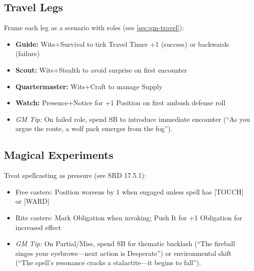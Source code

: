 \subsection{Travel Legs}
Frame each leg as a scenario with roles (see \ref{sec:gm-travel}):
\begin{itemize}
  \item \textbf{Guide:} Wits+Survival to tick Travel Timer +1 (success) or backwards (failure)
  \item \textbf{Scout:} Wits+Stealth to avoid surprise on first encounter
  \item \textbf{Quartermaster:} Wits+Craft to manage Supply
  \item \textbf{Watch:} Presence+Notice for +1 Position on first ambush defense roll
  \item \textit{GM Tip:} On failed role, spend SB to introduce immediate encounter (``As you argue the route, a wolf pack emerges from the fog'').
\end{itemize}

\subsection{Magical Experiments}
Treat spellcasting as pressure (see SRD 17.5.1):
\begin{itemize}
  \item Free casters: Position worsens by 1 when engaged unless spell has [TOUCH] or [WARD]
  \item Rite casters: Mark Obligation when invoking; Push It for +1 Obligation for increased effect
  \item \textit{GM Tip:} On Partial/Miss, spend SB for thematic backlash (``The fireball singes your eyebrows---next action is Desperate'') or environmental shift (``The spell's resonance cracks a stalactite---it begins to fall'').
\end{itemize}

